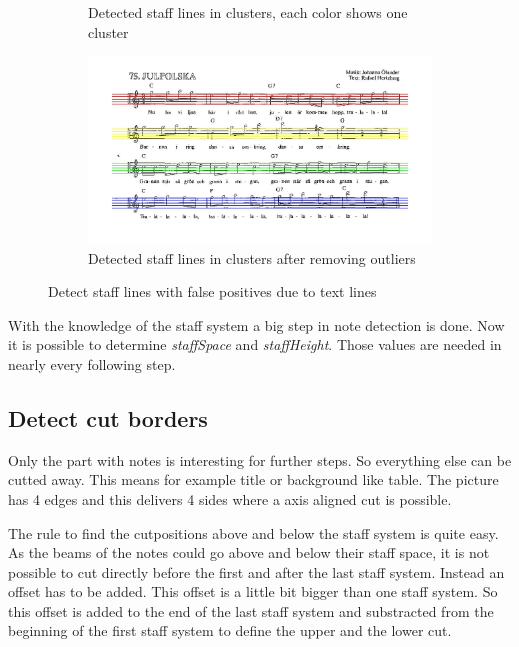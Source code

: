 \begin{figure}[htbp]
\begin{subfigure}[b]{0.48\textwidth}
        \caption{Detected staff lines in clusters, each color shows one cluster}
  \end{subfigure}
  \begin{subfigure}[b]{0.48\textwidth}
        \includegraphics[width=\textwidth]{staff_textLines_cluster2.jpg}
        \caption{Detected staff lines in clusters after removing outliers}
  \end{subfigure}
	\caption{Detect staff lines with false positives due to text lines}
	\label{fig:staffHard}
\end{figure}


With the knowledge of the staff system a big step in note detection is done. Now it is possible to determine \textit{staffSpace} and \textit{staffHeight}. Those values are needed in nearly every following step. 




\subsection{Detect cut borders}

Only the part with notes is interesting for further steps. So everything else can be cutted away. This means for example title or background like table.
The picture has 4 edges and this delivers 4 sides where a axis aligned cut is possible. 


The rule to find the cutpositions above and below the staff system is quite easy. As the beams of the notes could go above and below their staff space, it is not possible to cut directly before the first and after the last staff system. Instead an offset has to be added. This offset is a little bit bigger than one staff system.
So this offset is added to the end of the last staff system and substracted from the beginning of the first staff system to define the upper and the lower cut.

